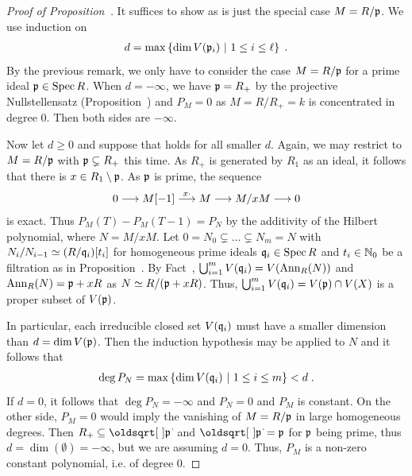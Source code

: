 \documentclass[a4paper,parskip=half,numbers=enddot, DIV=12]{scrreprt}
\begin{document}
\begin{proof}[Proof of Proposition~]
    It suffices to show   as  is just the special case $M=R/\mathfrak{p}$. We use induction on 
    \begin{align*}
	    d=\max\left\{\dim V(\mathfrak{p}_i)\ \middle|\  1\leq i\leq \ell\right\}\;.
    \end{align*}
    By the previous remark, we only have to consider the case $M=R/\mathfrak{p}$ for a prime ideal $\mathfrak{p}\in\operatorname{Spec} R$. When $d=-\infty$, we have $\mathfrak{p}=R_+$ by the projective Nullstellensatz (Proposition~) and $P_M=0$ as $M=R/R_+=k$ is concentrated in degree $0$. Then both sides are $-\infty$. 
    
    Now let $d\geq 0$ and suppose that  holds for all smaller $d$. Again, we may restrict to $M=R/\mathfrak{p}$ with $\mathfrak{p}\subsetneq R_+$ this time. As $R_+$ is generated by $R_1$ as an ideal, it follows that there is $x\in R_1\setminus \mathfrak{p}$. As $\mathfrak{p}$ is prime, the sequence
    \begin{align*}
        0 \morphism M[-1] \morphism[x\cdot] M \morphism M/x M \morphism 0
    \end{align*}
    is exact. Thus $P_M(T) -P_M(T-1) = P_N$ by the additivity of the Hilbert polynomial, where $N = M/xM $. Let $0 = N_0\subsetneq \ldots \subsetneq N_m = N$ with $N_i/N_{i-1} \simeq (R/\mathfrak{q}_i)[t_i]$ for homogeneous prime ideals $\mathfrak{q}_i\in \operatorname{Spec} R$  and $t_i\in \mathbb{N}_0$ be a filtration as in Proposition~. By Fact~, $\bigcup_{i=1}^m V(\mathfrak{q}_i) = V(\operatorname{Ann}_R(N))$ and $\operatorname{Ann}_R(N) = \mathfrak{p}+ xR$ as $N\simeq R/(\mathfrak{p}+xR)$. Thus, $\bigcup_{i=1}^m V(\mathfrak{q}_i) = V(\mathfrak{p})\cap V(X)$ is a proper subset of $V(\mathfrak{p})$. 
    
    In particular, each irreducible closed set $V(\mathfrak{q}_i)$ must have a smaller dimension than $d=\dim V(\mathfrak{p})$. Then the induction hypothesis may be applied to $N$ and it follows that 
    \begin{align*}
    	\deg P_N = \max\left\{\dim V(\mathfrak{q}_i)\ \middle|\  1\leq i \leq m\right\} < d\;.
    \end{align*}
    If $d=0$, it follows that $\deg P_N = -\infty$ and $P_N=0$ and $P_M$ is constant. On the other side, $P_M = 0$ would imply the vanishing of $M=R/\mathfrak{p}$ in large homogeneous degrees. Then $R_+\subseteq\sqrt{\pp}$ and $\sqrt{\pp}=\pp$ for $\mathfrak{p}$ being prime, thus $d=\dim(\emptyset)=-\infty$, but we are assuming $d=0$. Thus, $P_M$ is a non-zero constant polynomial, i.e. of degree $0$. 
    

\end{proof}
\end{document}
